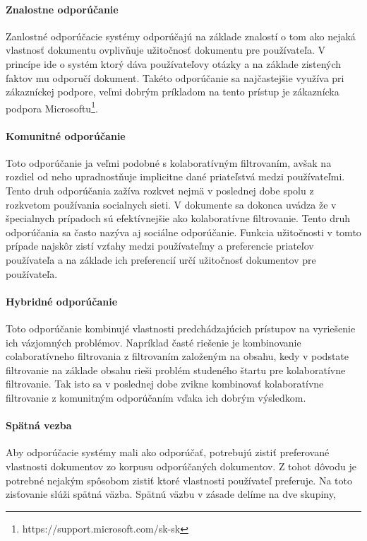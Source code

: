 \paragraph{Znalostne odporúčanie}

Zanlostné odporúčacie systémy odporúčajú na základe znalostí o tom ako nejaká vlastnosť 
dokumentu ovplivňuje užitočnosť dokumentu pre používateľa. V princípe ide o systém
ktorý dáva používateľovy otázky a na základe zistených faktov mu odporučí dokument.
Takéto odporúčanie sa najčastejšie využíva pri zákazníckej podpore, 
veľmi dobrým príkladom na tento prístup je zákaznícka podpora
Microsoftu\footnote{https://support.microsoft.com/sk-sk}.

\paragraph{Komunitné odporúčanie}

Toto odporúčanie ja veľmi podobné s kolaboratívným filtrovaním, avšak na rozdiel od neho
upradnostňuje implicitne dané priateľstvá medzi používateľmi.  Tento druh odporúčania
zažíva rozkvet nejmä v poslednej dobe spolu z rozkvetom používania socialnych sieti.
V dokumente\cite{recommender_categories} sa dokonca uvádza že v špecialnych 
prípadoch sú efektívnejšie ako kolaboratívne filtrovanie.
Tento druh odporúčania sa často nazýva aj sociálne odporúčanie.
Funkcia užitočnosti v tomto prípade najskôr zistí vzťahy medzi používateľmy a 
preferencie priateľov používateľa a na základe ich preferencií určí užitočnosť dokumentov
pre používateľa.

\paragraph{Hybridné odporúčanie}

Toto odporúčanie kombinujé vlastnosti predchádzajúcich prístupov na vyriešenie ich vázjomných
problémov. Napríklad časté riešenie je kombinovanie colaboratívneho filtrovania z 
filtrovaním založeným na obsahu, kedy v podstate filtrovanie na základe obsahu rieši problém
studeného štartu pre kolaboratívne filtrovanie. Tak isto sa v poslednej dobe 
zvikne kombinovať kolaboratívne filtrovanie z komunitným odporúčaním
vďaka ich dobrým výsledkom.

\paragraph{Spätná vezba}

Aby odporúčacie systémy mali ako odporúčať, potrebujú zistiť preferované vlastnosti dokumentov
zo korpusu odporúčaných dokumentov. Z tohot dôvodu je potrebné nejakým spôsobom zistiť 
ktoré vlastnosti používateľ preferuje. Na toto zisťovanie slúži spätná väzba. 
Spätnú väzbu v zásade delíme na dve skupiny, 

